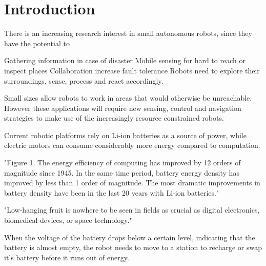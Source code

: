 \chapter{Introduction}
\label{chp:introduction}
	




There is an increasing research interest in small autonomous robots, since they have the potential to 



Gathering information in case of disaster
Mobile sensing for hard to reach or inspect places
Collaboration increase fault tolerance
Robots need to explore their surroundings, sense, process and react accordingly.

Small sizes allow robots to work in areas that would otherwise be unreachable. 
However these applications will require new sensing, control and navigation strategies to make use of the increasingly resource constrained robots.
	




Current robotic platforms rely on Li-ion batteries as a source of power, while electric motors can consume considerably more energy compared to computation. %

"Figure 1. The energy efficiency of computing has improved by 12 orders of magnitude since 1945. In the same time period, battery energy density has improved by less than 1 order of magnitude. The most dramatic improvements in battery density have been in the last 20 years with Li-ion batteries."
\cite{patel_pvc_2017}

"Low-hanging fruit is nowhere to be seen in fields as crucial as digital electronics, biomedical devices, or space technology."
\cite{zachary_spec_2016}


When the voltage of the battery drops below a certain level, indicating that the battery is almost empty, the robot needs to move to a station to recharge or swap it's battery before it runs out of energy.

